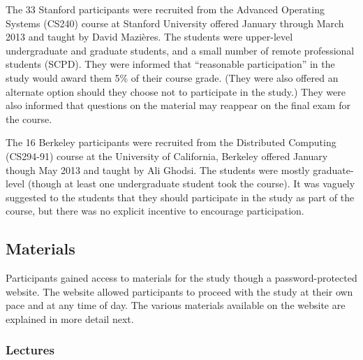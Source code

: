 The 33 Stanford participants were recruited from the Advanced
Operating Systems (CS240) course at Stanford University offered January
through March 2013 and taught by David Mazi\`{e}res. The students were
upper-level undergraduate and graduate students, and a small
number of remote professional students (SCPD). They were informed that
``reasonable participation'' in the study would award them
5\% of their
course grade. (They were also offered an alternate option should they
choose not to participate in the study.) They were also informed that
questions on the material may reappear on the final exam for the course.

The 16 Berkeley participants were recruited from the Distributed
Computing (CS294-91) course at the University of California, Berkeley
offered January though May 2013 and taught by Ali Ghodsi. The students
were mostly graduate-level (though at least one undergraduate student
took the course). It was vaguely suggested to the students that they
should participate in the study as part of the course, but there was no
explicit incentive to encourage participation.

\subsection{Materials}

Participants gained access to materials for the study though a
password-protected website.
The website allowed participants to proceed with the study at their own
pace and at any time of day. The various materials available on the
website are explained in more detail next.

\subsubsection{Lectures}

\begin{figure}
\centering
{}
\label{fig:userstudy:stylusoverlay}
\end{figure}

